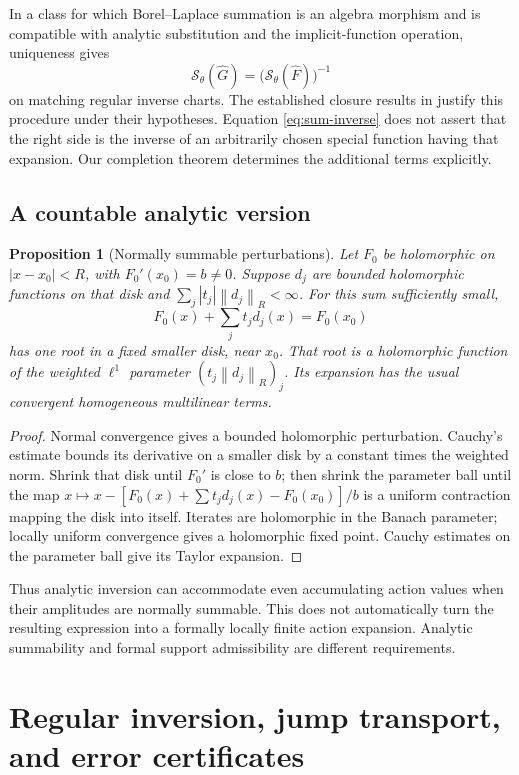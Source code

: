 \documentclass[11pt,a4paper]{article}
\numberwithin{equation}{section}
\newtheorem{proposition}[theorem]{Proposition}
\theoremstyle{definition}
\theoremstyle{remark}\newtheorem{remark}[theorem]{Remark}
\newcommand{\norm}[1]{\left\lVert#1\right\rVert}
\begin{document}
In a class for which Borel--Laplace summation is an algebra morphism and
is compatible with analytic substitution and the implicit-function
operation, uniqueness gives
\begin{equation}\label{eq:sum-inverse}
 \mathcal S_\theta(\widehat G)
       =\bigl(\mathcal S_\theta(\widehat F)\bigr)^{-1}
\end{equation}
on matching regular inverse charts. The established closure results in
\cite{sauzin} justify this procedure under their hypotheses. Equation
\eqref{eq:sum-inverse} does not assert that the right side is the inverse
of an arbitrarily chosen special function having that expansion.
Our completion theorem determines the additional terms explicitly.

\subsection{A countable analytic version}
\begin{proposition}[Normally summable perturbations]\label{prop:countable}
Let $F_0$ be holomorphic on $|x-x_0|<R$, with $F_0'(x_0)=b\ne0$.
Suppose $d_j$ are bounded holomorphic functions on that disk and
$\sum_j |t_j|\norm{d_j}_R<\infty$. For this sum sufficiently small,
\[
 F_0(x)+\sum_j t_jd_j(x)=F_0(x_0)
\]
has one root in a fixed smaller disk, near $x_0$. That root is a
holomorphic function of the weighted $\ell^1$ parameter
$(t_j\norm{d_j}_R)_j$. Its expansion has the usual convergent homogeneous
multilinear terms.
\end{proposition}
\begin{proof}
Normal convergence gives a bounded holomorphic perturbation. Cauchy's
estimate bounds its derivative on a smaller disk by a constant times the
weighted norm. Shrink that disk until $F_0'$ is close to $b$; then shrink
the parameter ball until the map
$x\mapsto x-[F_0(x)+\sum t_jd_j(x)-F_0(x_0)]/b$
is a uniform contraction mapping the disk into itself. Iterates are
holomorphic in the Banach parameter; locally uniform convergence gives
a holomorphic fixed point. Cauchy estimates on the parameter ball give
its Taylor expansion.
\end{proof}
Thus analytic inversion can accommodate even accumulating action values
when their amplitudes are normally summable. This does not automatically
turn the resulting expression into a formally locally finite action
expansion. Analytic summability and formal support admissibility are
different requirements.

\section{Regular inversion, jump transport, and error certificates}
\label{sec:regular}
\end{document}
